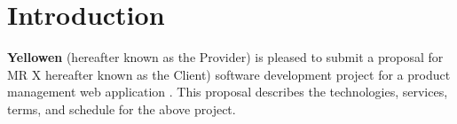 \documentclass[a4paper,12pt]{article}
\newcommand{\Title}{Software}
\newcommand{\SubTitle}{Proposal}
\newcommand{\PreparedFor}{MR X}
\newcommand{\ProposalFor}{a product management web application}
\begin{document}

\newpage

\section*{Introduction}
\textbf{Yellowen} (hereafter known as the Provider) is pleased to submit a proposal
for {\PreparedFor} hereafter known as the Client) software development project
for {\ProposalFor} . This proposal describes the technologies,
services, terms, and schedule for the above project.
\end{document}
